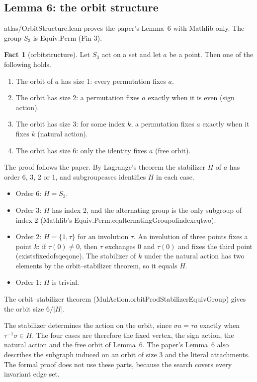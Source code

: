\documentclass[11pt,a4paper]{article}
\newcommand{\leanus}{\textunderscore\allowbreak}
\newcommand{\lean}[1]{{\ttfamily\let\_\leanus #1}}
\theoremstyle{definition}
\newtheorem{fact}{Fact}
\begin{document}
\subsection{Lemma 6: the orbit structure}\label{sec:lemma6}
\lean{atlas/OrbitStructure.lean} proves the paper's Lemma~6 with Mathlib
only. The group $S_3$ is \lean{Equiv.Perm (Fin 3)}.

\begin{fact}[\lean{orbit\_structure}]
Let $S_3$ act on a set and let $a$ be a point. Then one of the following
holds.
\begin{enumerate}
\item The orbit of $a$ has size 1: every permutation fixes $a$.
\item The orbit has size 2: a permutation fixes $a$ exactly when it is even
(sign action).
\item The orbit has size 3: for some index $k$, a permutation fixes $a$
exactly when it fixes $k$ (natural action).
\item The orbit has size 6: only the identity fixes $a$ (free orbit).
\end{enumerate}
\end{fact}

The proof follows the paper. By Lagrange's theorem the stabilizer $H$ of $a$
has order 6, 3, 2 or 1, and \lean{subgroup\_cases} identifies $H$ in each
case.
\begin{itemize}
\item Order 6: $H=S_3$.
\item Order 3: $H$ has index 2, and the alternating group is the only
subgroup of index 2 (Mathlib's
\lean{Equiv.Perm.eq\_alternatingGroup\_of\_index\_eq\_two}).
\item Order 2: $H=\{1,\tau\}$ for an involution $\tau$. An involution of three
points fixes a point $k$: if $\tau(0)\neq 0$, then $\tau$ exchanges $0$ and
$\tau(0)$ and fixes the third point (\lean{exists\_fixed\_of\_sq\_eq\_one}).
The stabilizer of $k$ under the natural action has two elements by the
orbit--stabilizer theorem, so it equals $H$.
\item Order 1: $H$ is trivial.
\end{itemize}
The orbit--stabilizer theorem
(\lean{MulAction.orbitProdStabilizerEquivGroup}) gives the orbit size
$6/|H|$.

The stabilizer determines the action on the orbit, since $\sigma a=\tau a$
exactly when $\tau^{-1}\sigma\in H$. The four cases are therefore the fixed
vertex, the sign action, the natural action and the free orbit of Lemma~6.
The paper's Lemma~6 also describes the subgraph induced on an orbit of size 3
and the literal attachments. The formal proof does not use these parts,
because the search covers every invariant edge set.
\end{document}
